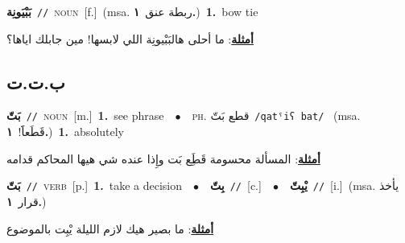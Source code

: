 \documentclass[10pt,a4paper,twoside]{article} %
\begin{document}
\begin{multicols}{2}
{\setlength\topsep{0pt}\textbf{\foreignlanguage{arabic}{بَبْيَونِة}}\ {\color{gray}\texttt{//}\color{black}}\ \textsc{noun}\ [f.]\ \color{gray}(msa. \foreignlanguage{arabic}{ربطة عنق}~\foreignlanguage{arabic}{\textbf{١.}})\color{black}\ \textbf{1.}~bow tie\  \begin{flushright}\color{gray}\foreignlanguage{arabic}{\textbf{\underline{\foreignlanguage{arabic}{أمثلة}}}: ما أحلى هالبَبْيونِة اللي لابسها! مين جابلك اياها؟}\end{flushright}\color{black}} \vspace{2mm}

\vspace{-3mm}
\subsection*{\color{blue}\foreignlanguage{arabic}{ب.ت.ت}\color{blue}{}} 

{\setlength\topsep{0pt}\textbf{\foreignlanguage{arabic}{بَتّ}}\ {\color{gray}\texttt{//}\color{black}}\ \textsc{noun}\ [m.]\ \textbf{1.}~see phrase\ \ $\bullet$\ \ \textsc{ph.} \color{gray} \foreignlanguage{arabic}{قطع بَتّ}\color{black}\ {\color{gray}\texttt{/{\sffamily qatˤiʕ bat}/}\color{black}}\ \color{gray} (msa. \foreignlanguage{arabic}{قَطَعاََ!}~\foreignlanguage{arabic}{\textbf{١.}})\color{black}\ \textbf{1.}~absolutely\  \begin{flushright}\color{gray}\foreignlanguage{arabic}{\textbf{\underline{\foreignlanguage{arabic}{أمثلة}}}: المسألة محسومة قَطَِع بَت وإِذا عنده شي هيها المحاكم قدامه}\end{flushright}\color{black}} \vspace{2mm}

{\setlength\topsep{0pt}\textbf{\foreignlanguage{arabic}{بَتّ}}\ {\color{gray}\texttt{//}\color{black}}\ \textsc{verb}\ [p.]\ \textbf{1.}~take a decision\ \ $\bullet$\ \ \setlength\topsep{0pt}\textbf{\foreignlanguage{arabic}{بِتّ}}\ {\color{gray}\texttt{//}\color{black}}\ [c.]\ \ $\bullet$\ \ \setlength\topsep{0pt}\textbf{\foreignlanguage{arabic}{يْبِتّ}}\ {\color{gray}\texttt{//}\color{black}}\ [i.]\ \color{gray}(msa. \foreignlanguage{arabic}{يأخذ قرار}~\foreignlanguage{arabic}{\textbf{١.}})\color{black}\  \begin{flushright}\color{gray}\foreignlanguage{arabic}{\textbf{\underline{\foreignlanguage{arabic}{أمثلة}}}: ما بصير هيك لازم الليلة يْبِت بالموضوع}\end{flushright}\color{black}} \vspace{2mm}


\end{multicols}
\end{document}
